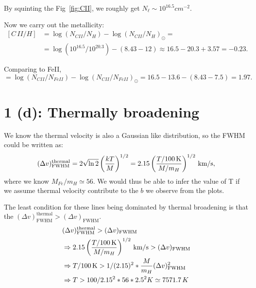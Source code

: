 \documentclass[12pt,letterpaper]{article}
\newcommand{\mt}{\mathrm}
\newcommand{\kms}{\textrm{\,km/s}}
\newcommand{\dvfwhm}{(\Delta v)_{\textrm{FWHM}}}
\begin{document}
By squinting the Fig~\ref{fig:CII}, we roughly get $N_\ell \sim 10^{16.5} cm^{-2}$.

Now we carry out the metallicity:
\begin{equation*}
    \begin{split}
        [C\,II/H] &= 
        \log{(N_{CII} / N_H)} - \log{(N_{CII} / N_H)}_\odot =\\
        &= \log{(10^{16.5} / 10^{20.3})} - ( 8.43 - 12 ) \approx 
        16.5 - 20.3 + 3.57 = -0.23.                
    \end{split}
\end{equation*}

Comparing to FeII,
\begin{equation*}
    [C\,II, Fe\,II] = \log{(N_{CII} / N_{FeII})} - \log{(N_{CII} / N_{FeII})}_{\odot}
    = 16.5 - 13.6 - (8.43 - 7.5) = 1.97.
\end{equation*}


\section*{1 (d): Thermally broadening}
We know the thermal velocity is also a Gaussian like distribution, so the FWHM could be written as:
\begin{equation}
    \dvfwhm^{\textrm{thermal}} = 2 \sqrt{\ln 2} \left( \frac{k T}{M} \right)^{1/2} 
    = 2.15 \left( \frac{T / 100\, \mt K}{M / m_H} \right)^{1/2} 
    \kms,
    \label{eq:thermal}
\end{equation}
where we know $M_{Fe} / m_H \simeq 56$.
We would thus be able to infer the value of T if we assume thermal velocity contribute to the $b$ we observe from the plots.

The least condition for these lines being dominated by thermal broadening is that the $\dvfwhm^{\textrm{thermal}} > \dvfwhm$.
\begin{equation*}
    \begin{split}
        &\dvfwhm^{\textrm{thermal}} > \dvfwhm\\
        &\Rightarrow
        2.15 \left( \frac{T / 100\, \mt K}{M / m_H} \right)^{1/2} 
    \kms >  \dvfwhm\\
        &\Rightarrow
        T / 100\, {\mt K} > 1/(2.15)^2 * \frac{M}{m_H} \dvfwhm^2\\
        &\Rightarrow 
        T > 100/2.15^2 * 56 * 2.5^2 K \simeq 7571.7\,K
    \end{split}
\end{equation*}
\end{document}
